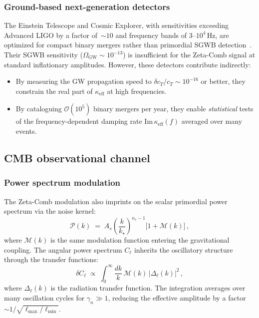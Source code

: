\documentclass[12pt,a4paper]{article}
\begin{document}
\subsubsection{Ground-based next-generation detectors}

The Einstein Telescope and Cosmic Explorer,
with sensitivities exceeding Advanced LIGO by a
factor of~$\sim\!10$ and frequency bands of
3--$10^4\,$Hz, are optimized for compact binary
mergers rather than primordial SGWB
detection~\cite{ET2020,CE2024}.
Their SGWB sensitivity
($\Omega_{\mathrm{GW}}\sim 10^{-13}$) is
insufficient for the Zeta-Comb signal at standard
inflationary amplitudes.
However, these detectors contribute indirectly:
\begin{itemize}
\item By measuring the GW propagation speed to
  $\delta c_T/c_T \sim 10^{-16}$ or better,
  they constrain the real part of $\kappa_{\mathrm{eff}}$
  at high frequencies.
\item By cataloguing $\mathcal{O}(10^5)$ binary
  mergers per year, they enable \emph{statistical}
  tests of the frequency-dependent damping rate
  $\mathrm{Im}\,\kappa_{\mathrm{eff}}(f)$
  averaged over many events.
\end{itemize}


\subsection{CMB observational channel}
\label{sec:cmb-channel}

\subsubsection{Power spectrum modulation}

The Zeta-Comb modulation also imprints on the
scalar primordial power spectrum via the noise kernel:
\begin{equation}\label{eq:Pk-mod}
  \mathcal{P}(k)
  \;=\;
  A_s\left(\frac{k}{k_\star}\right)^{n_s-1}
  \bigl[1 + \mathcal{M}(k)\bigr]\,,
\end{equation}
where $\mathcal{M}(k)$ is the same modulation function
entering the gravitational coupling.
The angular power spectrum $C_\ell$ inherits the
oscillatory structure through the transfer functions:
\begin{equation}\label{eq:Cell-mod}
  \delta C_\ell
  \;\propto\;
  \int_0^\infty \frac{dk}{k}\,
  \mathcal{M}(k)\,
  |\Delta_\ell(k)|^2\,,
\end{equation}
where $\Delta_\ell(k)$ is the radiation transfer
function.  The integration averages over many
oscillation cycles for $\gamma_n\gg 1$, reducing
the effective amplitude by a factor
$\sim 1/\sqrt{\ell_{\max}/\ell_{\min}}$.
\end{document}

